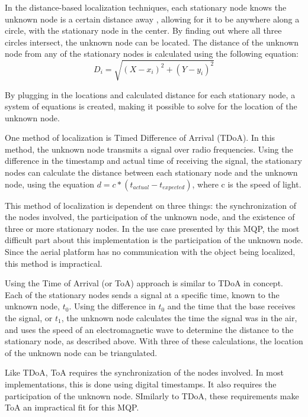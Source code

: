 In the distance-based localization techniques, each stationary node knows the unknown node is a certain distance away \cite{local_conf}, allowing for it to be anywhere along a circle, with the stationary node in the center. By finding out where all three circles intersect, the unknown node can be located. The distance of the unknown node from any of the stationary nodes is calculated using the following equation:
\[D_i =\sqrt{(X - x_i)^2 + (Y-y_i)^2}\]\par
By plugging in the locations and calculated distance for each stationary node, a system of equations is created, making it possible to solve for the location of the unknown node.\par
One method of localization is Timed Difference of Arrival (TDoA)\cite{local_conf}. In this method, the unknown node transmits a signal over radio frequencies. Using the difference in the timestamp and actual time of receiving the signal, the stationary nodes can calculate the distance between each stationary node and the unknown node, using the equation \( d = c*(t_{actual} - t_{expected}) \), where c is the speed of light. \par
This method of localization is dependent on three things: the synchronization of the nodes involved, the participation of the unknown node, and the existence of three or more stationary nodes. In the use case presented by this MQP, the most difficult part about this implementation is the participation of the unknown node. Since the aerial platform has no communication with the object being localized, this method is impractical. \par

Using the Time of Arrival (or ToA) approach is similar to TDoA in concept\cite{local_conf}. Each of the stationary nodes sends a signal at a specific time, known to the unknown node, $t_0$. Using the difference in $t_0$ and the time that the base receives the signal, or $t_1$, the unknown node calculates the time the signal was in the air, and uses the speed of an electromagnetic wave to determine the distance to the stationary node, as described above. With three of these calculations, the location of the unknown node can be triangulated.\par
Like TDoA, ToA requires the synchronization of the nodes involved\cite{local_conf}. In most implementations, this is done using digital timestamps. It also requires the participation of the unknown node. SImilarly to TDoA, these requirements make ToA an impractical fit for this MQP.


